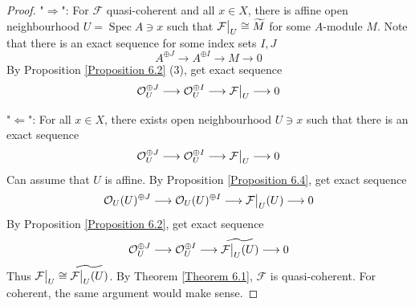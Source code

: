 \documentclass{ctexart}
\newcommand{\spec}{\operatorname{Spec}}
\begin{document}
\begin{proof}
    "$\Rightarrow$": For $\mathcal{F}$ quasi-coherent and all $x\in X$, 
    there is affine open neighbourhood $U = \spec A\ni x$ such that $\mathcal{F}\big{|}_{U} \cong \widetilde{M}$ for some $A$-module $M$.
    Note that there is an exact sequence for some index sets $I,J$
    \begin{equation*}
        A^{\oplus J} \longrightarrow A^{\oplus I} \longrightarrow M \longrightarrow 0
    \end{equation*}
    By Proposition \ref{Proposition 6.2} (3), get exact sequence
    \begin{equation*}
        \mathcal{O}_{U}^{\oplus J} \longrightarrow \mathcal{O}_{U}^{\oplus I} \longrightarrow \mathcal{F}\big{|}_{U} \longrightarrow 0
    \end{equation*}
    \par
    "$\Leftarrow$": For all $x\in X$, there exists open neighbourhood $U\ni x$ such that there is an exact sequence
    \begin{equation*}
        \mathcal{O}_{U}^{\oplus J} \longrightarrow \mathcal{O}_{U}^{\oplus I} \longrightarrow \mathcal{F}\big{|}_{U} \longrightarrow 0
    \end{equation*}
    Can assume that $U$ is affine.
    By Proposition \ref{Proposition 6.4}, get exact sequence
    \begin{equation*}
        \mathcal{O}_{U}(U)^{\oplus J} \longrightarrow \mathcal{O}_{U}(U)^{\oplus I} \longrightarrow \mathcal{F}\big{|}_{U}(U) \longrightarrow 0
    \end{equation*}
    By Proposition \ref{Proposition 6.2}, get exact sequence
    \begin{equation*}
        \mathcal{O}_{U}^{\oplus J} \longrightarrow \mathcal{O}_{U}^{\oplus I} \longrightarrow \widetilde{\mathcal{F}\big{|}_{U}(U)} \longrightarrow 0
    \end{equation*}
    Thus $\mathcal{F}\big{|}_{U} \cong \widetilde{\mathcal{F}\big{|}_{U}(U)}$.
    By Theorem \ref{Theorem 6.1}, $\mathcal{F}$ is quasi-coherent.
    For coherent, the same argument would make sense.
\end{proof}
\end{document}
